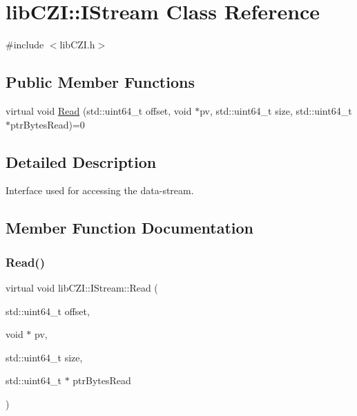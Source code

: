 \hypertarget{classlib_c_z_i_1_1_i_stream}{}\section{lib\+C\+ZI\+:\+:I\+Stream Class Reference}
\label{classlib_c_z_i_1_1_i_stream}


{\ttfamily \#include $<$lib\+C\+Z\+I.\+h$>$}

\subsection*{Public Member Functions}
\begin{DoxyCompactItemize}
\item 
virtual void \hyperlink{classlib_c_z_i_1_1_i_stream_ae275276d0da5082a3711527ddfedfd9f}{Read} (std\+::uint64\+\_\+t offset, void $\ast$pv, std\+::uint64\+\_\+t size, std\+::uint64\+\_\+t $\ast$ptr\+Bytes\+Read)=0
\end{DoxyCompactItemize}


\subsection{Detailed Description}
Interface used for accessing the data-\/stream. 

\subsection{Member Function Documentation}
\mbox{\label{classlib_c_z_i_1_1_i_stream_ae275276d0da5082a3711527ddfedfd9f}} 
\subsubsection{\texorpdfstring{Read()}{Read()}}
{\footnotesize\ttfamily virtual void lib\+C\+Z\+I\+::\+I\+Stream\+::\+Read (\begin{DoxyParamCaption}\item[{std\+::uint64\+\_\+t}]{offset,  }\item[{void $\ast$}]{pv,  }\item[{std\+::uint64\+\_\+t}]{size,  }\item[{std\+::uint64\+\_\+t $\ast$}]{ptr\+Bytes\+Read }\end{DoxyParamCaption})\hspace{0.3cm}{\ttfamily [pure virtual]}}

